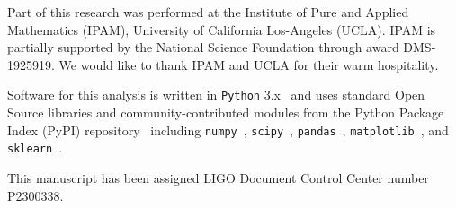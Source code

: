Part of this research was performed at the Institute of Pure and Applied Mathematics (IPAM),  University of California Los-Angeles (UCLA). IPAM is partially supported by the National Science
Foundation through award DMS-1925919. We would like to thank IPAM and UCLA for their warm hospitality. 

Software for this analysis is written in \texttt{Python} 3.x~\cite{python3} and uses standard Open Source libraries and community-contributed modules from the Python Package Index (PyPI)
repository~\cite{pypi} including \texttt{numpy}~\cite{harris2020array}, \texttt{scipy}~\cite{2020SciPy-NMeth}, \texttt{pandas}~\cite{reback2020pandas,mckinney-proc-scipy-2010},
\texttt{matplotlib}~\cite{Hunter:2007ouj}, and \texttt{sklearn}~\cite{scikit-learn}.

This manuscript has been assigned LIGO Document Control Center number P2300338.





